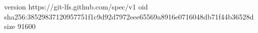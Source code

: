 version https://git-lfs.github.com/spec/v1
oid sha256:38529837120957751f1c9d92d7972eee65569a8916e0716048db71f44b36528d
size 91600
